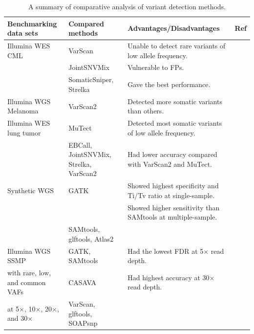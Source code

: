 \documentclass[a4,center,fleqn]{NAR}
\begin{document}
\begin{landscape}
\begin{table}[htbp]
  \centering
  \small
  \caption{A summary of comparative analysis of variant detection methods.}\label{tbl:comparison}
  \begin{threeparttable}
    \begin{tabular}{rlrr}
    \multicolumn{1}{l}{\textbf{Benchmarking data sets}} & \textbf{Compared methods} & \multicolumn{1}{l}{\textbf{Advantages/Disadvantages}} & \multicolumn{1}{l}{\textbf{Ref}} \\
    \toprule
    \multicolumn{1}{l}{Illumina WES  CML} & VarScan & \multicolumn{1}{l}{Unable to detect rare variants of low allele frequency.} &~\citep{Roberts2013} \\
          & JointSNVMix & \multicolumn{1}{l}{Vulnerable to FPs.} &  \\
          & SomaticSniper, Strelka & \multicolumn{1}{l}{Gave the best performance.} &  \\

    \midrule
    \multicolumn{1}{l}{Illumina WGS Melanoma } & VarScan2 & \multicolumn{1}{l}{Detected more somatic variants than others.} &~\citep{wang2013detecting} \\
    \multicolumn{1}{l}{Illumina WES lung tumor} & MuTect & \multicolumn{1}{l}{Detected most somatic variants of low allele frequency.} &  \\
          & EBCall, JointSNVMix, Strelka, VarScan2 & \multicolumn{1}{l}{Had lower accuracy compared with VarScan2 and MuTect.} &  \\

    \midrule
    \multicolumn{1}{l}{Synthetic WGS} & GATK  & \multicolumn{1}{l}{Showed highest specificity and Ti/Tv ratio at single-sample. } &~\citep{liu2013variant}\\
          &       & \multicolumn{1}{l}{Showed higher sensitivity than SAMtools at multiple-sample.} &  \\
          & SAMtools, glftools, Atlas2 &       &  \\

    \midrule
    \multicolumn{1}{l}{Illumina WGS SSMP} & GATK, SAMtools & \multicolumn{1}{l}{Had the lowest FDR at 5$\times$ read depth.} &~\citep{Cheng2014}\\
    \multicolumn{1}{l}{with rare, low, and common VAFs} & CASAVA & \multicolumn{1}{l}{Had highest accuracy at 30$\times$ read depth.} &  \\
    \multicolumn{1}{l}{at 5$\times$, 10$\times$, 20$\times$, and 30$\times$ } & VarScan, glftools, SOAPsnp &       &  \\


\end{tabular}
\end{threeparttable}
\end{table}
\end{landscape}
\end{document}
